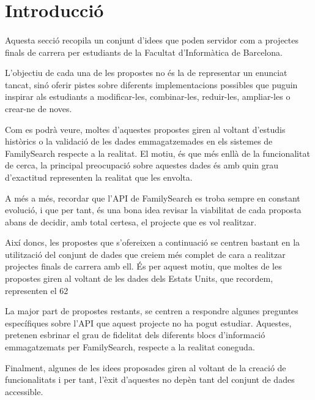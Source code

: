 \section{Introducció}

    \paragraph{}
    Aquesta secció recopila un conjunt d'idees que poden servidor com a projectes finals de carrera per estudiants de la Facultat d'Informàtica de Barcelona.

    L'objectiu de cada una de les propostes no és la de representar un enunciat tancat, sinó oferir pistes sobre diferents implementacions possibles que puguin inspirar als estudiants a modificar-les, combinar-les, reduir-les, ampliar-les o crear-ne de noves.

    Com es podrà veure, moltes d'aquestes propostes giren al voltant d'estudis històrics o la validació de les dades emmagatzemades en els sistemes de FamilySearch respecte a la realitat. El motiu, és que més enllà de la funcionalitat de cerca, la principal preocupació sobre aquestes dades és amb quin grau d'exactitud representen la realitat que les envolta.

    A més a més, recordar que l'API de FamilySearch es troba sempre en constant evolució, i que per tant, és una bona idea revisar la viabilitat de cada proposta abans de decidir, amb total certesa, el projecte que es vol realitzar.

    Així doncs, les propostes que s’ofereixen a continuació se centren bastant en la utilització del conjunt de dades que creiem més complet de cara a realitzar projectes finals de carrera amb ell. És per aquest motiu, que moltes de les propostes giren al voltant de les dades dels Estats Units, que recordem, representen el 62%

    La major part de propostes restants, se centren a respondre algunes preguntes específiques sobre l’API que aquest projecte no ha pogut estudiar. Aquestes, pretenen esbrinar el grau de fidelitat dels diferents blocs d’informació emmagatzemats per FamilySearch, respecte a la realitat coneguda.

    Finalment, algunes de les idees proposades giren al voltant de la creació de funcionalitats i per tant, l’èxit d’aquestes no depèn tant del conjunt de dades accessible.

